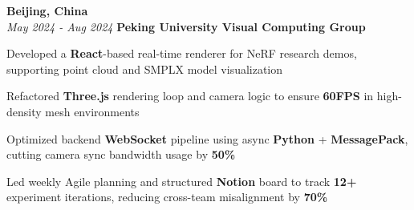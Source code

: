 \vspace{0.2cm}

\begin{twocolentry}{
    \textbf{Beijing, China} \\
    \textit{May 2024 - Aug 2024}
}{
    \textbf{Peking University Visual Computing Group} \\
}
\end{twocolentry}
\begin{onecolentry}
    \begin{highlights}
        \item Developed a \textbf{React}-based real-time renderer for NeRF research demos, supporting point cloud and SMPLX model visualization
        \item Refactored \textbf{Three.js} rendering loop and camera logic to ensure \textbf{60FPS} in high-density mesh environments
        \item Optimized backend \textbf{WebSocket} pipeline using async \textbf{Python} + \textbf{MessagePack}, cutting camera sync bandwidth usage by \textbf{50\%}
        \item Led weekly Agile planning and structured \textbf{Notion} board to track \textbf{12+} experiment iterations, reducing cross-team misalignment by \textbf{70\%}
    \end{highlights}
\end{onecolentry}
